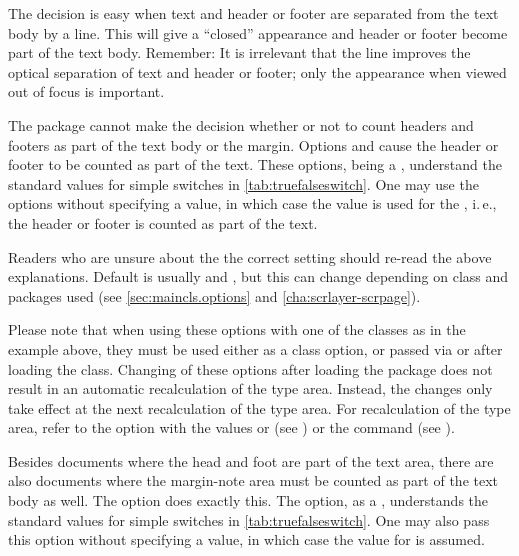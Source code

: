 \begin{Explain}
  The decision is easy when text and header or footer are separated
  from the text body by a line. This will give a ``closed'' appearance
  and header or footer become part of the text body.  Remember: It is
  irrelevant that the line improves the optical separation of text and
  header or footer; only the appearance when viewed out
  of focus is important.
\end{Explain}

The  package cannot make the decision whether or
not to count headers and footers as part of the text body or the
margin. Options  and  cause
the header or footer to be counted as part of the text.  These
options, being a ,
understand the standard values for simple switches in
\autoref{tab:truefalseswitch}. One may use the options without
specifying a value, in which case the value  is used for
the , i.\,e., the header or footer is counted as part of
the text.

Readers who are unsure about the the correct setting should re-read
the above explanations. Default is usually
 and ,
but this can change depending on {\KOMAScript} class and {\KOMAScript}
packages used (see \autoref{sec:maincls.options} and
\autoref{cha:scrlayer-scrpage}).

Please note that when using these options with one of the
{\KOMAScript} classes as in the example above, they must be used
either as a class option, or passed via  or
 after loading the class. Changing of these options
after loading the  package does not result in an
automatic recalculation of the type area. Instead, the changes only
take effect at the next recalculation of the type area. For
recalculation of the type area, refer to the  option with
the values  or  (see
) or the
 command (see
).%
%
\EndIndexGroup


\begin{Declaration}
\end{Declaration}
Besides documents where the head and foot are part of the
text area, there are also documents where the margin-note area must be
counted as part of the text body as well.  The option  does
exactly this.  The option, as a
, understands the
standard values for simple switches in
\autoref{tab:truefalseswitch}. One may also pass this option without
specifying a value, in which case the value  for
 is assumed.

